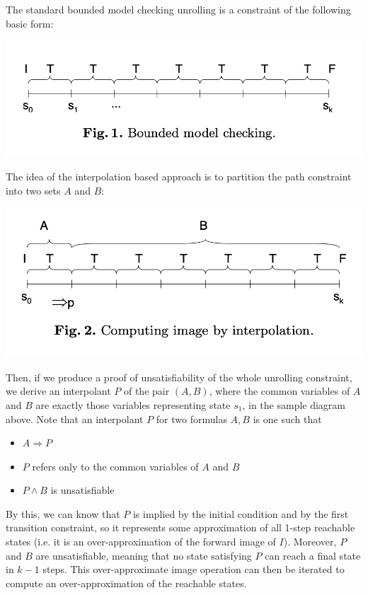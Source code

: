 \documentclass[10pt,a4paper]{article}
\begin{document}
The standard bounded model checking unrolling is a constraint of the following basic form:
\begin{center}
    \includegraphics[scale=0.38]{diagrams/bmc.png}
\end{center}
The idea of the interpolation based approach is to partition the path constraint into two sets $A$ and $B$:
\begin{center}
    \includegraphics[scale=0.38]{diagrams/bmc-interpolant.png}   
\end{center}
Then, if we produce a proof of unsatisfiability of the whole unrolling constraint, we derive an interpolant $P$ of the pair $(A,B)$, where the common variables of $A$ and $B$ are exactly those variables representing state $s_1$, in the sample diagram above. Note that an interpolant $P$ for two formulas $A,B$ is one such that 
\begin{itemize}
    \item $A \Rightarrow P$
    \item $P$ refers only to the common variables of $A$ and $B$
    \item $P \wedge B$ is unsatisfiable
\end{itemize}

By this, we can know that $P$ is implied by the initial condition and by the first transition constraint, so it represents some approximation of all 1-step reachable states (i.e. it is an over-approximation of the forward image of $I$). Moreover, $P$ and $B$ are unsatisfiable, meaning that no state satisfying $P$ can reach a final state in $k-1$ steps. This over-approximate image operation can then be iterated to compute an over-approximation of the reachable states. 
\end{document}
